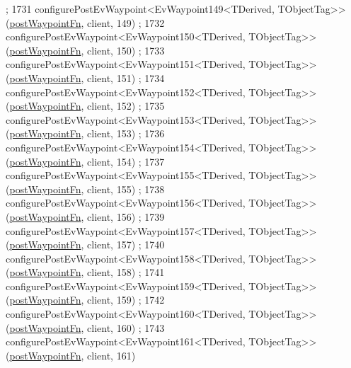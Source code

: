 \begin{DoxyCode}
      ;
1731     configurePostEvWaypoint<EvWaypoint149<TDerived, TObjectTag>>(\hyperlink{classmove__base__z__client_1_1WaypointEventDispatcher_acc538eb7506c13f7cca2268a1742dadd}{postWaypointFn}, client, 149)
      ;
1732     configurePostEvWaypoint<EvWaypoint150<TDerived, TObjectTag>>(\hyperlink{classmove__base__z__client_1_1WaypointEventDispatcher_acc538eb7506c13f7cca2268a1742dadd}{postWaypointFn}, client, 150)
      ;
1733     configurePostEvWaypoint<EvWaypoint151<TDerived, TObjectTag>>(\hyperlink{classmove__base__z__client_1_1WaypointEventDispatcher_acc538eb7506c13f7cca2268a1742dadd}{postWaypointFn}, client, 151)
      ;
1734     configurePostEvWaypoint<EvWaypoint152<TDerived, TObjectTag>>(\hyperlink{classmove__base__z__client_1_1WaypointEventDispatcher_acc538eb7506c13f7cca2268a1742dadd}{postWaypointFn}, client, 152)
      ;
1735     configurePostEvWaypoint<EvWaypoint153<TDerived, TObjectTag>>(\hyperlink{classmove__base__z__client_1_1WaypointEventDispatcher_acc538eb7506c13f7cca2268a1742dadd}{postWaypointFn}, client, 153)
      ;
1736     configurePostEvWaypoint<EvWaypoint154<TDerived, TObjectTag>>(\hyperlink{classmove__base__z__client_1_1WaypointEventDispatcher_acc538eb7506c13f7cca2268a1742dadd}{postWaypointFn}, client, 154)
      ;
1737     configurePostEvWaypoint<EvWaypoint155<TDerived, TObjectTag>>(\hyperlink{classmove__base__z__client_1_1WaypointEventDispatcher_acc538eb7506c13f7cca2268a1742dadd}{postWaypointFn}, client, 155)
      ;
1738     configurePostEvWaypoint<EvWaypoint156<TDerived, TObjectTag>>(\hyperlink{classmove__base__z__client_1_1WaypointEventDispatcher_acc538eb7506c13f7cca2268a1742dadd}{postWaypointFn}, client, 156)
      ;
1739     configurePostEvWaypoint<EvWaypoint157<TDerived, TObjectTag>>(\hyperlink{classmove__base__z__client_1_1WaypointEventDispatcher_acc538eb7506c13f7cca2268a1742dadd}{postWaypointFn}, client, 157)
      ;
1740     configurePostEvWaypoint<EvWaypoint158<TDerived, TObjectTag>>(\hyperlink{classmove__base__z__client_1_1WaypointEventDispatcher_acc538eb7506c13f7cca2268a1742dadd}{postWaypointFn}, client, 158)
      ;
1741     configurePostEvWaypoint<EvWaypoint159<TDerived, TObjectTag>>(\hyperlink{classmove__base__z__client_1_1WaypointEventDispatcher_acc538eb7506c13f7cca2268a1742dadd}{postWaypointFn}, client, 159)
      ;
1742     configurePostEvWaypoint<EvWaypoint160<TDerived, TObjectTag>>(\hyperlink{classmove__base__z__client_1_1WaypointEventDispatcher_acc538eb7506c13f7cca2268a1742dadd}{postWaypointFn}, client, 160)
      ;
1743     configurePostEvWaypoint<EvWaypoint161<TDerived, TObjectTag>>(\hyperlink{classmove__base__z__client_1_1WaypointEventDispatcher_acc538eb7506c13f7cca2268a1742dadd}{postWaypointFn}, client, 161)

\end{DoxyCode}
